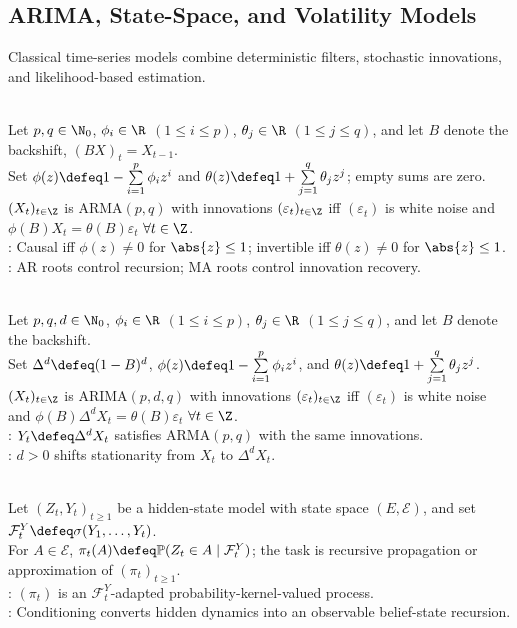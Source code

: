 \subsection{ARIMA, State-Space, and Volatility Models}

Classical time-series models combine deterministic filters, stochastic innovations, and likelihood-based estimation.

\begin{definition} \label{def:arma-model} \\
Let $p,q\in\N_0$, $\phi_i\in\R$ $(1\leq i\leq p)$, $\theta_j\in\R$ $(1\leq j\leq q)$, and let $B$ denote the backshift, $(BX)_t=X_{t-1}$.\\
Set $\phi(z)\defeq1-\sum\limits_{i=1}^{p}\phi_i z^i$ and $\theta(z)\defeq1+\sum\limits_{j=1}^{q}\theta_j z^j$; empty sums are zero.\\
$(X_t)_{t\in\Z}$ is ARMA$(p,q)$ with innovations $(\varepsilon_t)_{t\in\Z}$ iff $(\varepsilon_t)$ is white noise and $\phi(B)X_t=\theta(B)\varepsilon_t$ $\forall t\in\Z$.\\
: Causal iff $\phi(z)\neq0$ for $\abs{z}\leq1$; invertible iff $\theta(z)\neq0$ for $\abs{z}\leq1$.\\
: AR roots control recursion; MA roots control innovation recovery.
\end{definition}

\begin{definition} \label{def:arima-model} \\
Let $p,q,d\in\N_0$, $\phi_i\in\R$ $(1\leq i\leq p)$, $\theta_j\in\R$ $(1\leq j\leq q)$, and let $B$ denote the backshift.\\
Set $\Delta^d\defeq(1-B)^d$, $\phi(z)\defeq1-\sum\limits_{i=1}^{p}\phi_i z^i$, and $\theta(z)\defeq1+\sum\limits_{j=1}^{q}\theta_j z^j$.\\
$(X_t)_{t\in\Z}$ is ARIMA$(p,d,q)$ with innovations $(\varepsilon_t)_{t\in\Z}$ iff $(\varepsilon_t)$ is white noise and $\phi(B)\Delta^dX_t=\theta(B)\varepsilon_t$ $\forall t\in\Z$.\\
: $Y_t\defeq\Delta^dX_t$ satisfies ARMA$(p,q)$ with the same innovations.\\
: $d>0$ shifts stationarity from $X_t$ to $\Delta^dX_t$.
\end{definition}

\begin{definition} \label{def:filtering-problem} \\
Let $(Z_t,Y_t)_{t\geq1}$ be a hidden-state model with state space $(E,\mathcal{E})$, and set $\mathcal{F}_t^Y\defeq\sigma(Y_1,\ldots,Y_t)$.\\
For $A\in\mathcal{E}$, $\pi_t(A)\defeq\mathbb{P}(Z_t\in A\mid\mathcal{F}_t^Y)$; the task is recursive propagation or approximation of $(\pi_t)_{t\geq1}$.\\
: $(\pi_t)$ is an $\mathcal{F}_t^Y$-adapted probability-kernel-valued process.\\
: Conditioning converts hidden dynamics into an observable belief-state recursion.
\end{definition}

